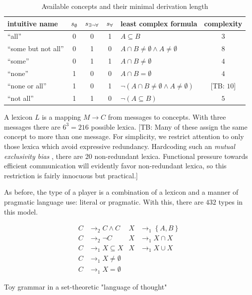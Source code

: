\documentclass[a4paper]{article}
\newcommand{\tb}[1]{\textcolor[rgb]{.8,.33,.0}{[TB: #1]}}%
\newcommand{\set}[1]{\left\{#1\right\}}
\newcommand{\state}{\ensuremath{s}\xspace}		%
\newcommand{\mystate}[1]{\ensuremath{\state_{\text{#1}}}\xspace} %
\newcommand{\Messgs}{\ensuremath{M}\xspace}		%
\newcommand{\ssome}{\mystate{\ensuremath{\exists\neg\forall}}}
\newcommand{\sall}{\mystate{\ensuremath{\forall}}}
\newcommand{\snone}{\mystate{\ensuremath{\emptyset}}}
\begin{document}
\begin{table}
  \centering
\begin{center}
  \begin{tabular}{lccclc}
    \toprule
    intuitive name
    & \snone
    & \ssome
    & \sall
    & least complex formula
    & complexity
    \\ \midrule
    ``all''
    & 0
    & 0
    & 1
    & $A \subseteq B$
    & $3$
    \\
    ``some but not all''
    & 0
    & 1
    & 0
    & $A \cap B \neq \emptyset \wedge A \neq \emptyset$
    & $8$
    \\    
    ``some''
    & 0
    & 1
    & 1
    & $A \cap B \neq \emptyset$
    & $4$
    \\
    ``none''
    & 1
    & 0
    & 0
    & $A \cap B = \emptyset$
    & $4$
    \\
    ``none or all''
    & 1
    & 0
    & 1
    & $\neg(A \cap B \neq \emptyset \wedge A \neq \emptyset)$
    & \tb{$10$}
    \\
    ``not all''
    & 1
    & 1
    & 0
    & $\neg (A \subseteq B)$
    & $5$
    \\
    \bottomrule
  \end{tabular}
\end{center}
\caption{Available concepts and their minimal derivation length}
\label{tab:concepts}
\end{table}

A lexicon $L$ is a mapping $\Messgs \rightarrow C$ from messages to concepts. With three
messages there are $6^3 = 216$ possible lexica. \tb{Many of these assign the same concept to
more than one message. For simplicity, we restrict attention to only those lexica which avoid
expressive redundancy. Hardcoding such an \emph{mutual exclusivity bias}
\citep[e.g.][]{Clark2009:Lexical-Meaning}, there are 20 non-redundant lexica. Functional
pressure towards efficient communication will evidently favor non-redundant lexica, so this
restriction is fairly innocuous but practical.}

As before, the type of a player is a combination of a lexicon and a manner of pragmatic
language use: literal or pragmatic. With this, there are $432$ types in this model.

\begin{table}
  \centering
  \begin{align*}
    C & \rightarrow_2 C \wedge C 
    & 
    X & \rightarrow_1 \set{A,B} \\
    C & \rightarrow_2 \neg C 
    & 
    X & \rightarrow_1 X \cap X \\
    C & \rightarrow_1 X \subseteq X
    & 
    X & \rightarrow_1 X \cup X \\
    C & \rightarrow_1 X \neq \emptyset \\
    C & \rightarrow_1 X = \emptyset     
  \end{align*}
  \caption{Toy grammar in a set-theoretic "language of thought"}
  \label{tab:grammar}
\end{table}
\end{document}
